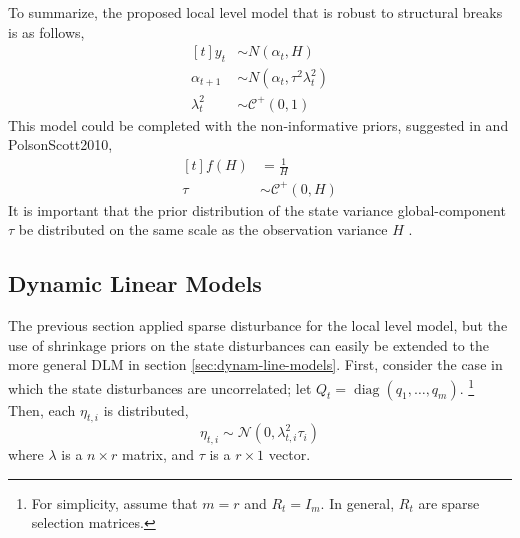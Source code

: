 \documentclass{article}
\newcommand{\dist}[1]{\mathcal{#1}}
\newcommand{\paren}[1]{\ensuremath{\left(#1\right)}}
\newcommand{\dnorm}[1]{\ensuremath{\dist{N}\paren{#1}}}
\newcommand{\dhalfcauchy}[1]{\ensuremath{\dist{C}^{+}\paren{#1}}}
\DeclareMathOperator{\diag}{diag}
\begin{document}
To summarize, the proposed local level model that is robust to structural breaks is as follows,
\begin{equation}
  \label{eq:10}
  \begin{aligned}[t]
    y_{t} &\sim N(\alpha_{t}, H) \\
    \alpha_{t + 1} &\sim N(\alpha_{t}, \tau^{2} \lambda^{2}_{t}) \\
    \lambda^{2}_{t} & \sim \dhalfcauchy{0, 1}
  \end{aligned}
\end{equation}
This model could be completed with the non-informative priors, suggested in \textcite{CarvalhoPolsonScott2009} and {PolsonScott2010},
\begin{equation}
  \label{eq:7}
  \begin{aligned}[t]
    f(H) &= \frac{1}{H} \\
    \tau &\sim \dhalfcauchy{0, H}
  \end{aligned}
\end{equation}
It is important that the prior distribution of the state variance global-component $\tau$ be distributed on the same scale as the observation variance $H$ \parencite{PolsonScott2012}.

\subsection{Dynamic Linear Models}
\label{sec:multivariate}

The previous section applied sparse disturbance for the local level model, but the use of shrinkage priors on the state disturbances can easily be extended to the more general DLM in section \ref{sec:dynam-line-models}.
First, consider the case in which the state disturbances are uncorrelated; let $Q_{t} = \diag(q_{1}, \dots, q_{m})$.%
\footnote{
  For simplicity, assume that $m = r$ and $R_{t} = I_{m}$.
  In general, $R_{t}$ are sparse selection matrices.
}
Then, each $\eta_{t,i}$ is distributed,
\begin{equation}
  \label{eq:20}
  \eta_{t,i} \sim \dnorm{0, \lambda_{t,i}^{2} \tau_{i}}
\end{equation}
where $\lambda$ is a $n \times r$ matrix, and $\tau$ is a $r \times 1$ vector.
\end{document}
